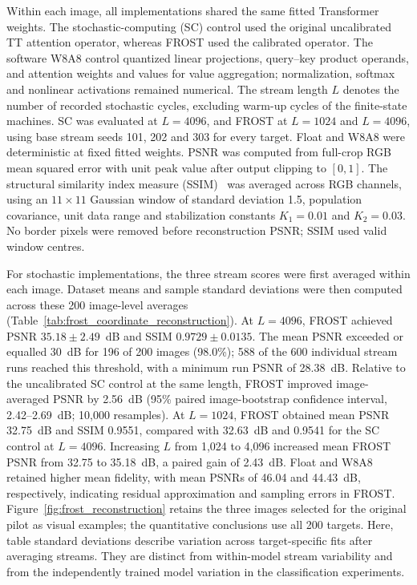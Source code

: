\documentclass[pdflatex,sn-mathphys-num]{sn-jnl}
\theoremstyle{thmstyleone}
\theoremstyle{thmstyletwo}
\theoremstyle{thmstylethree}
\begin{document}
Within each image, all implementations shared the same fitted Transformer
weights. The stochastic-computing (SC) control used the original
uncalibrated TT attention operator, whereas FROST used the calibrated
operator. The software W8A8 control quantized linear projections,
query--key product operands, and attention weights and values for value
aggregation; normalization, softmax and nonlinear activations remained
numerical. The stream length $L$ denotes the number of recorded stochastic
cycles, excluding warm-up cycles of the finite-state machines.
SC was evaluated at $L=4096$, and FROST at
$L=1024$ and $L=4096$, using base stream seeds 101, 202 and 303 for
every target. Float and W8A8 were deterministic at fixed fitted weights.
PSNR was computed from full-crop RGB mean
squared error with unit peak value after output clipping to $[0,1]$.
The structural similarity index measure
(SSIM)~\cite{wang2004ssim} was averaged across RGB channels, using an
$11\times11$ Gaussian window of standard deviation 1.5, population
covariance, unit data range and stabilization constants $K_1=0.01$
and $K_2=0.03$. No border pixels were removed before reconstruction PSNR;
SSIM used valid window centres.

For stochastic implementations, the three stream scores were first averaged
within each image. Dataset means and sample standard deviations were then
computed across these 200 image-level averages
(Table~\ref{tab:frost_coordinate_reconstruction}). At $L=4096$, FROST
achieved PSNR $35.18\pm2.49$~dB and SSIM
$0.9729\pm0.0135$.
The mean PSNR exceeded or equalled 30~dB for 196 of 200 images
(98.0\%); 588 of the 600 individual stream runs
reached this threshold, with a minimum run PSNR of 28.38~dB.
Relative to the uncalibrated SC control at the same length, FROST improved
image-averaged PSNR by 2.56~dB (95\% paired image-bootstrap confidence
interval, 2.42--2.69~dB; 10,000 resamples).
At $L=1024$, FROST obtained mean PSNR 32.75~dB and SSIM
0.9551, compared with 32.63~dB and 0.9541 for
the SC control at $L=4096$.
Increasing $L$ from 1,024 to 4,096 increased mean FROST PSNR from
32.75 to 35.18~dB, a paired gain of 2.43~dB.
Float and W8A8 retained higher mean fidelity, with mean PSNRs of
46.04 and 44.43~dB, respectively, indicating residual
approximation and sampling errors in FROST.
Figure~\ref{fig:frost_reconstruction} retains the three images selected
for the original pilot as visual examples; the quantitative conclusions
use all 200 targets. Here, table standard deviations describe variation
across target-specific fits after averaging streams. They are distinct
from within-model stream variability and from the independently trained
model variation in the classification experiments.
\end{document}
